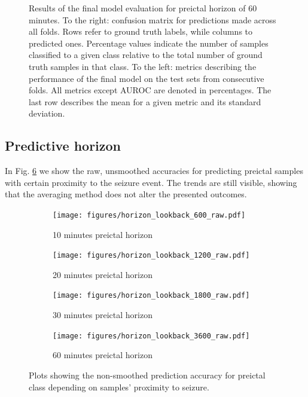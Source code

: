 \documentclass[a4paper,fleqn]{cas-sc}
\begin{document}
\begin{figure}[hbt]
\begin{minipage}[t]{0.55\textwidth}
    \label{tab:metrics-lookback-3600}
  \end{minipage}
  
  \addtocounter{figure}{-1}
    \captionsetup{labelformat=andtable}
    \caption{Results of the final model evaluation for preictal horizon of 60 minutes. To the right: confusion matrix for predictions made across all folds. Rows refer to ground truth labels, while columns to predicted ones. Percentage values indicate the number of samples classified to a given class relative to the total number of ground truth samples in that class. To the left: metrics describing the performance of the final model on the test sets from consecutive folds. All metrics except AUROC are denoted in percentages. The last row describes the mean for a given metric and its standard deviation.}
\end{figure}

\subsection{Predictive horizon}
In Fig. \ref{fig:predictive-horizon-raw} we show the raw, unsmoothed accuracies for predicting preictal samples with certain proximity to the seizure event. The trends are still visible, showing that the averaging method does not alter the presented outcomes.
\begin{figure}[h]
	\centering
	\begin{subfigure}{0.48\linewidth}
		\texttt{[image: figures/horizon\_lookback\_600\_raw.pdf]}
		\caption{10 minutes preictal horizon}
		\label{fig:preictal-accuracy-raw-10min}
	\end{subfigure}
	\begin{subfigure}{0.48\linewidth}
		\texttt{[image: figures/horizon\_lookback\_1200\_raw.pdf]}
		\caption{20 minutes preictal horizon}
		\label{fig:preictal-accuracy-raw-20min}
	\end{subfigure}
        \vfill
	\begin{subfigure}{0.48\linewidth}
	        \texttt{[image: figures/horizon\_lookback\_1800\_raw.pdf]}
	        \caption{30 minutes preictal horizon}
	        \label{fig:preictal-accuracy-raw-30min}
         \end{subfigure}
         \begin{subfigure}{0.48\linewidth}
	        \texttt{[image: figures/horizon\_lookback\_3600\_raw.pdf]}
	        \caption{60 minutes preictal horizon}
	        \label{fig:preictal-accuracy-raw-60min}
         \end{subfigure}
	\caption{Plots showing the non-smoothed prediction accuracy for preictal class depending on samples' proximity to seizure.}
	\label{fig:predictive-horizon-raw}
\end{figure}
\FloatBarrier
\end{document}
